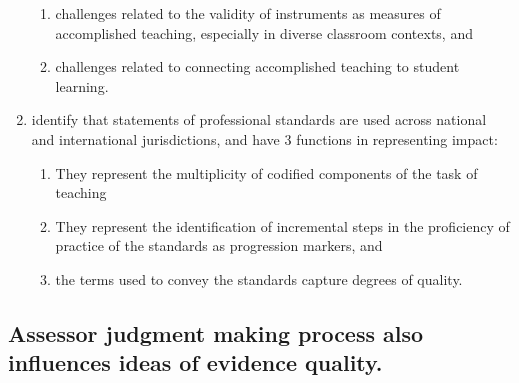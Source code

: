 \begin{enumerate}
\begin{enumerate}
            \item challenges related to the validity of instruments as measures of accomplished teaching, especially in diverse classroom contexts, and
            \item challenges related to connecting accomplished teaching to student learning.
        \end{enumerate}
        \item \textcite{wyatt-smithStandardsPracticeStandards2017} identify that statements of professional standards are used across national and international jurisdictions, and have 3 functions in representing impact:
        \begin{enumerate}
            \item They represent the multiplicity of codified components of the task of teaching
            \item They represent the identification of incremental steps in the proficiency of practice of the standards as progression markers, and
            \item the terms used to convey the standards capture degrees of quality.
        \end{enumerate}
    \end{enumerate}

\bigskip   
\subsection{Assessor judgment making process also influences ideas of evidence quality.}
\medskip

